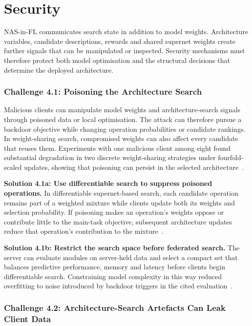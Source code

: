 \section{Security}

NAS-in-FL communicates search state in addition to model weights. Architecture variables, candidate descriptions, rewards and shared supernet weights create further signals that can be manipulated or inspected. Security mechanisms must therefore protect both model optimisation and the structural decisions that determine the deployed architecture.

\subsubsection{Challenge 4.1: Poisoning the Architecture Search}

Malicious clients can manipulate model weights and architecture-search signals through poisoned data or local optimisation. The attack can therefore pursue a backdoor objective while changing operation probabilities or candidate rankings. In weight-sharing search, compromised weights can also affect every candidate that reuses them. Experiments with one malicious client among eight found substantial degradation in two discrete weight-sharing strategies under fourfold-scaled updates, showing that poisoning can persist in the selected architecture~\cite{privacy_preserving_fednas_for_edge_2025}.

\noindent\textbf{Solution 4.1a: Use differentiable search to suppress poisoned operations.} In differentiable supernet-based search, each candidate operation remains part of a weighted mixture while clients update both its weights and selection probability. If poisoning makes an operation's weights oppose or contribute little to the main-task objective, subsequent architecture updates reduce that operation's contribution to the mixture~\cite{privacy_preserving_fednas_for_edge_2025}.

\noindent\textbf{Solution 4.1b: Restrict the search space before federated search.} The server can evaluate modules on server-held data and select a compact set that balances predictive performance, memory and latency before clients begin differentiable search. Constraining model complexity in this way reduced overfitting to noise introduced by backdoor triggers in the cited evaluation~\cite{privacy_preserving_fednas_for_edge_2025}.

\subsubsection{Challenge 4.2: Architecture-Search Artefacts Can Leak Client Data}

